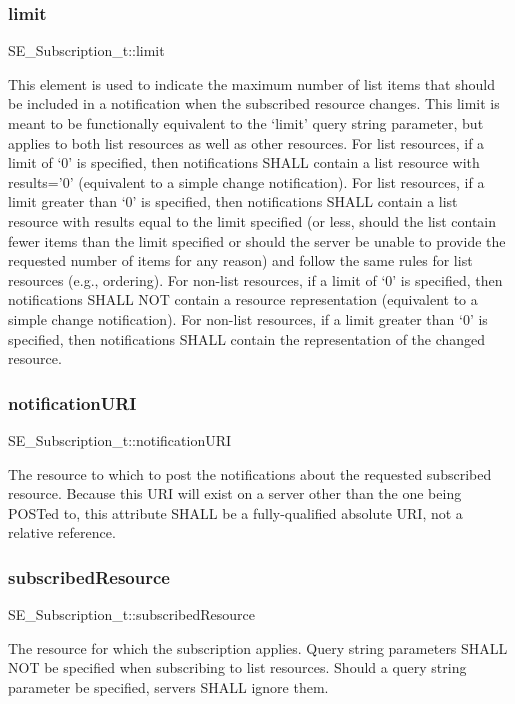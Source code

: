 \subsubsection{\texorpdfstring{limit}{limit}}
{\footnotesize\ttfamily S\+E\+\_\+\+Subscription\+\_\+t\+::limit}

This element is used to indicate the maximum number of list items that should be included in a notification when the subscribed resource changes. This limit is meant to be functionally equivalent to the ‘limit’ query string parameter, but applies to both list resources as well as other resources. For list resources, if a limit of ‘0’ is specified, then notifications S\+H\+A\+LL contain a list resource with results=’0’ (equivalent to a simple change notification). For list resources, if a limit greater than ‘0’ is specified, then notifications S\+H\+A\+LL contain a list resource with results equal to the limit specified (or less, should the list contain fewer items than the limit specified or should the server be unable to provide the requested number of items for any reason) and follow the same rules for list resources (e.\+g., ordering). For non-\/list resources, if a limit of ‘0’ is specified, then notifications S\+H\+A\+LL N\+OT contain a resource representation (equivalent to a simple change notification). For non-\/list resources, if a limit greater than ‘0’ is specified, then notifications S\+H\+A\+LL contain the representation of the changed resource. \mbox{\label{group__Subscription_gaa9e106fec3c507732a98db50afb9cc34}} 
\subsubsection{\texorpdfstring{notification\+U\+RI}{notificationURI}}
{\footnotesize\ttfamily S\+E\+\_\+\+Subscription\+\_\+t\+::notification\+U\+RI}

The resource to which to post the notifications about the requested subscribed resource. Because this U\+RI will exist on a server other than the one being P\+O\+S\+Ted to, this attribute S\+H\+A\+LL be a fully-\/qualified absolute U\+RI, not a relative reference. \mbox{\label{group__Subscription_ga6bb29c2c4620a20e0162662014161d18}} 
\subsubsection{\texorpdfstring{subscribed\+Resource}{subscribedResource}}
{\footnotesize\ttfamily S\+E\+\_\+\+Subscription\+\_\+t\+::subscribed\+Resource}

The resource for which the subscription applies. Query string parameters S\+H\+A\+LL N\+OT be specified when subscribing to list resources. Should a query string parameter be specified, servers S\+H\+A\+LL ignore them. 